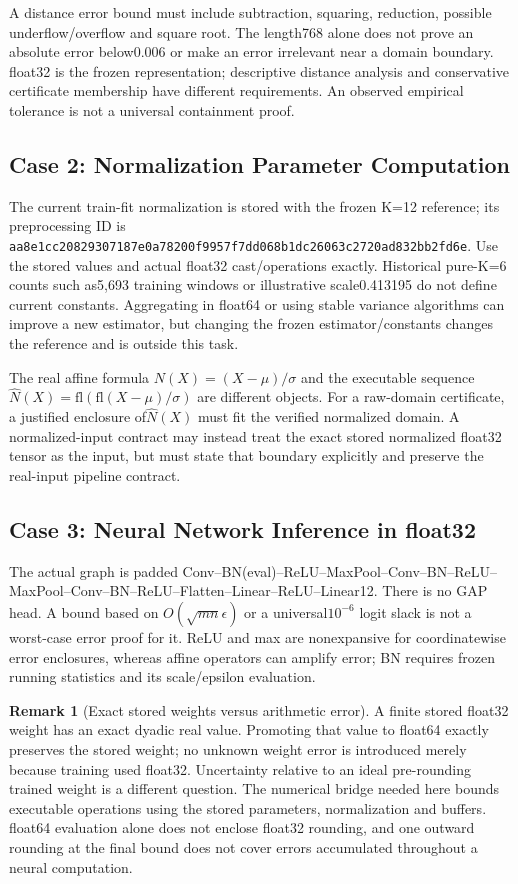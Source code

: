 \documentclass[11pt, a4paper]{article}
\theoremstyle{definition}
\newtheorem{remark}{Remark}[section]
\theoremstyle{plain}
\newcommand{\code}[1]{{\small\ttfamily\nolinkurl{#1}}}
\begin{document}
A distance error bound must include subtraction, squaring, reduction,
possible underflow/overflow and square root. The length768 alone does not
prove an absolute error below0.006 or make an error irrelevant near a domain
boundary. float32 is the frozen representation; descriptive distance analysis
and conservative certificate membership have different requirements. An
observed empirical tolerance is not a universal containment proof.

\subsection{Case 2: Normalization Parameter Computation}
The current train-fit normalization is stored with the frozen K=12 reference;
its preprocessing ID is
\code{aa8e1cc20829307187e0a78200f9957f7dd068b1dc26063c2720ad832bb2fd6e}.
Use the stored values and actual float32 cast/operations exactly. Historical
pure-K=6 counts such as5,693 training windows or illustrative scale0.413195
do not define current constants. Aggregating in float64 or using stable
variance algorithms can improve a new estimator, but changing the frozen
estimator/constants changes the reference and is outside this task.

The real affine formula $N(X)=(X-\mu)/\sigma$ and the executable sequence
$\widehat N(X)=\mathrm{fl}(\mathrm{fl}(X-\mu)/\sigma)$ are different objects.
For a raw-domain certificate, a justified enclosure of$\widehat N(X)$ must
fit the verified normalized domain. A normalized-input contract may instead
treat the exact stored normalized float32 tensor as the input, but must state
that boundary explicitly and preserve the real-input pipeline contract.

\subsection{Case 3: Neural Network Inference in float32}
The actual graph is padded Conv--BN(eval)--ReLU--MaxPool--Conv--BN--ReLU--
MaxPool--Conv--BN--ReLU--Flatten--Linear--ReLU--Linear12. There is no GAP head.
A bound based on $O(\sqrt{mn}\epsilon)$ or a universal$10^{-6}$ logit slack
is not a worst-case error proof for it. ReLU and max are nonexpansive for
coordinatewise error enclosures, whereas affine operators can amplify error;
BN requires frozen running statistics and its scale/epsilon evaluation.

\begin{remark}[Exact stored weights versus arithmetic error]
A finite stored float32 weight has an exact dyadic real value. Promoting that
value to float64 exactly preserves the stored weight; no unknown weight error
is introduced merely because training used float32. Uncertainty relative to
an ideal pre-rounding trained weight is a different question. The numerical
bridge needed here bounds executable operations using the stored parameters,
normalization and buffers. float64 evaluation alone does not enclose float32
rounding, and one outward rounding at the final bound does not cover errors
accumulated throughout a neural computation.
\end{remark}
\end{document}
